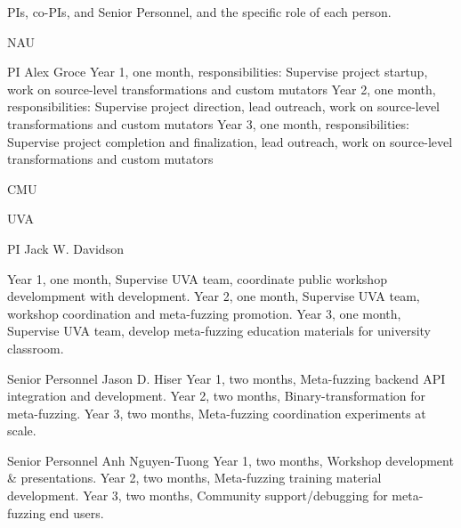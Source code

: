 PIs, co-PIs, and Senior Personnel, and the specific role of each person.


NAU

PI Alex Groce
Year 1, one month, responsibilities:  Supervise project startup, work on source-level transformations and custom mutators
Year 2, one month, responsibilities:  Supervise project direction, lead outreach, work on source-level transformations and custom mutators
Year 3, one month, responsibilities:  Supervise project completion and finalization, lead outreach, work on source-level transformations and custom mutators


CMU


UVA

PI Jack W. Davidson

Year 1,  one month, Supervise UVA team, coordinate public workshop develompment with development.
Year 2,  one month, Supervise UVA team, workshop coordination and meta-fuzzing promotion.
Year 3,  one month, Supervise UVA team, develop meta-fuzzing education materials for university classroom.

Senior Personnel Jason D. Hiser
Year 1,  two months, Meta-fuzzing backend API integration and development.
Year 2,  two months, Binary-transformation for meta-fuzzing.
Year 3,  two months, Meta-fuzzing coordination experiments at scale.


Senior Personnel Anh Nguyen-Tuong
Year 1,  two months, Workshop development \& presentations.
Year 2,  two months, Meta-fuzzing training material development.
Year 3,  two months, Community support/debugging for meta-fuzzing end users.

